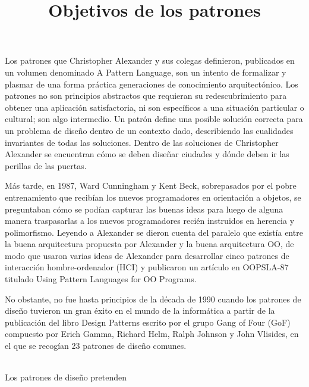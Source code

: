 \documentclass[a4paper,10pt]{report}
\begin{document}
Los patrones que Christopher Alexander y sus colegas definieron, publicados en un volumen denominado A Pattern Language, son un intento de formalizar y plasmar de una forma práctica generaciones de conocimiento arquitectónico. Los patrones no son principios abstractos que requieran su redescubrimiento para obtener una aplicación satisfactoria, ni son específicos a una situación particular o cultural; son algo intermedio. Un patrón define una posible solución correcta para un problema de diseño dentro de un contexto dado, describiendo las cualidades invariantes de todas las soluciones. Dentro de las soluciones de Christopher Alexander se encuentran cómo se deben diseñar ciudades y dónde deben ir las perillas de las puertas.

Más tarde, en 1987, Ward Cunningham y Kent Beck, sobrepasados por el pobre entrenamiento que recibían los nuevos programadores en orientación a objetos, se preguntaban cómo se podían capturar las buenas ideas para luego de alguna manera traspasarlas a los nuevos programadores recién instruidos en herencia y polimorfismo. Leyendo a Alexander se dieron cuenta del paralelo que existía entre la buena arquitectura propuesta por Alexander y la buena arquitectura OO, de modo que usaron varias ideas de Alexander para desarrollar cinco patrones de interacción hombre-ordenador (HCI) y publicaron un artículo en OOPSLA-87 titulado Using Pattern Languages for OO Programs.

No obstante, no fue hasta principios de la década de 1990 cuando los patrones de diseño tuvieron un gran éxito en el mundo de la informática a partir de la publicación del libro Design Patterns escrito por el grupo Gang of Four (GoF) compuesto por Erich Gamma, Richard Helm, Ralph Johnson y John Vlisides, en el que se recogían 23 patrones de diseño comunes.\\

\title{\textbf{Objetivos de los patrones}}\\

Los patrones de diseño pretenden\\
\end{document}
